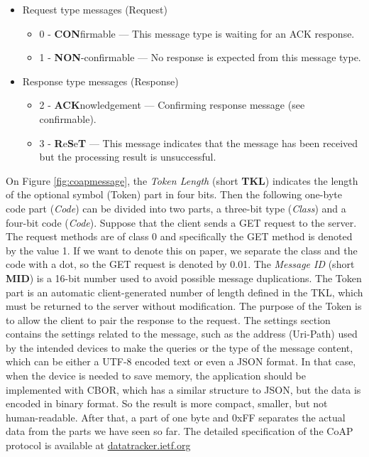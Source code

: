 \begin{itemize}
    \item Request type messages (Request)
        \begin{itemize}
            \item 0 - \textbf{CON}firmable --- This message type is waiting for an ACK response.
            \item 1 - \textbf{NON}-confirmable --- No response is expected from this message type.
        \end{itemize}
    \item Response type messages (Response)
        \begin{itemize}
            \item 2 - \textbf{ACK}nowledgement --- Confirming response message (see confirmable).
            \item 3 - \textbf{R}e\textbf{S}e\textbf{T} --- This message indicates that the message has been received but the processing result is unsuccessful.
        \end{itemize}
\end{itemize}
\noindent
On Figure \ref{fig:coapmessage}, the \textit{Token Length} (short \textbf{TKL}) indicates the length of the optional symbol (Token) part in four bits. Then the following one-byte code part (\textit{Code}) can be divided into two parts, a three-bit type (\textit{Class}) and a four-bit code (\textit{Code}). Suppose that the client sends a GET request to the server. The request methods are of class 0 and specifically the GET method is denoted by the value 1. If we want to denote this on paper, we separate the class and the code with a dot, so the GET request is denoted by 0.01. The \textit{Message ID} (short \textbf{MID}) is a 16-bit number used to avoid possible message duplications. The Token part is an automatic client-generated number of length defined in the TKL, which must be returned to the server without modification. The purpose of the Token is to allow the client to pair the response to the request. The settings section contains the settings related to the message, such as the address (Uri-Path) used by the intended devices to make the queries or the type of the message content, which can be either a UTF-8 encoded text or even a JSON format. In that case, when the device is needed to save memory, the application should be implemented with CBOR, which has a similar structure to JSON, but the data is encoded in binary format. So the result is more compact, smaller, but not human-readable. After that, a part of one byte and 0xFF separates the actual data from the parts we have seen so far. The detailed specification of the CoAP protocol is available at \href{https://datatracker.ietf.org/doc/html/rfc7252}{datatracker.ietf.org}\cite{datatracker}

